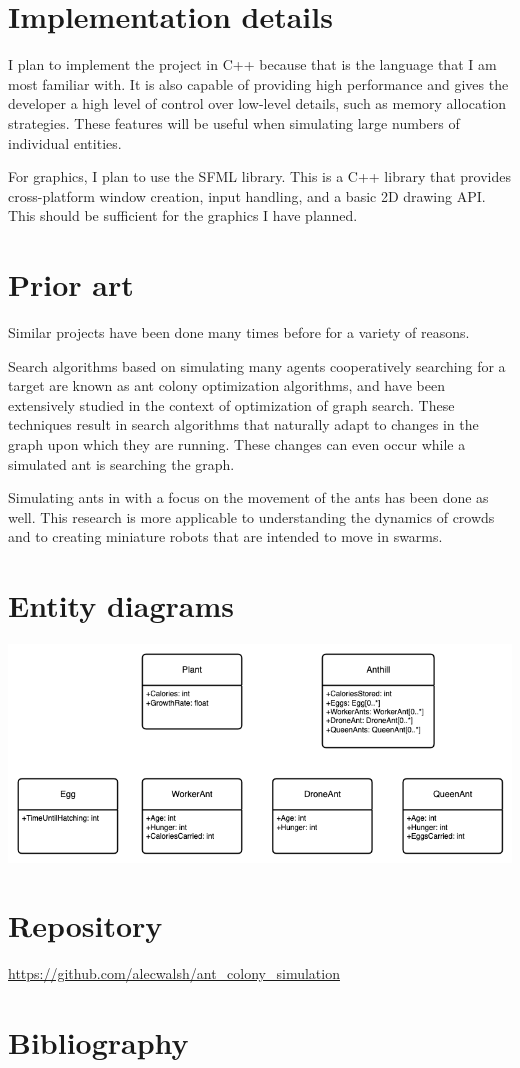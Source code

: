 \documentclass[journal]{IEEEtran}
\begin{document}
\section{Implementation details}

I plan to implement the project in C++ because that is the language that I am most familiar with.  It is also capable of providing high performance and gives the developer a high level of control over low-level details, such as memory allocation strategies.
These features will be useful when simulating large numbers of individual entities.


For graphics, I plan to use the SFML library.  This is a C++ library that provides cross-platform window creation, input handling, and a basic 2D drawing API.  This should be sufficient for the graphics I have planned.


\section{Prior art}

Similar projects have been done many times before for a variety of reasons.

Search algorithms based on simulating many agents cooperatively searching for a target are known as ant colony optimization algorithms, and have been extensively studied in the context of optimization of graph search.\cite{ant-colony-optimization}  These techniques result in search algorithms that naturally adapt to changes in the graph upon which they are running.  These changes can even occur while a simulated ant is searching the graph.

Simulating ants in with a focus on the movement of the ants has been done as well.\cite{antsim:1}  This research is more applicable to understanding the dynamics of crowds and to creating miniature robots that are intended to move in swarms.



\section{Entity diagrams}

\includegraphics[scale=0.5]{entity_diagrams.png}


\section{Repository}
\url{https://github.com/alecwalsh/ant_colony_simulation}

\section{Bibliography}



\end{document}
